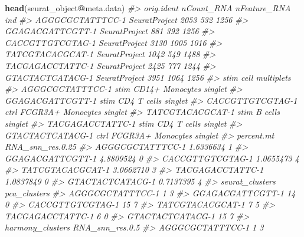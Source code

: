 \documentclass[
]{book}
\newenvironment{Shaded}{\begin{snugshade}}{\end{snugshade}}
\newcommand{\CommentTok}[1]{\textcolor[rgb]{0.56,0.35,0.01}{\textit{#1}}}
\newcommand{\FunctionTok}[1]{\textcolor[rgb]{0.13,0.29,0.53}{\textbf{#1}}}
\newcommand{\NormalTok}[1]{#1}
\newcommand{\SpecialCharTok}[1]{\textcolor[rgb]{0.81,0.36,0.00}{\textbf{#1}}}
\begin{document}
\begin{Shaded}
\begin{Highlighting}[]
\FunctionTok{head}\NormalTok{(seurat\_object}\SpecialCharTok{@}\NormalTok{meta.data)}
\CommentTok{\#\textgreater{}                     orig.ident nCount\_RNA nFeature\_RNA  ind}
\CommentTok{\#\textgreater{} AGGGCGCTATTTCC{-}1 SeuratProject       2053          532 1256}
\CommentTok{\#\textgreater{} GGAGACGATTCGTT{-}1 SeuratProject        881          392 1256}
\CommentTok{\#\textgreater{} CACCGTTGTCGTAG{-}1 SeuratProject       3130         1005 1016}
\CommentTok{\#\textgreater{} TATCGTACACGCAT{-}1 SeuratProject       1042          549 1488}
\CommentTok{\#\textgreater{} TACGAGACCTATTC{-}1 SeuratProject       2425          777 1244}
\CommentTok{\#\textgreater{} GTACTACTCATACG{-}1 SeuratProject       3951         1064 1256}
\CommentTok{\#\textgreater{}                  stim              cell multiplets}
\CommentTok{\#\textgreater{} AGGGCGCTATTTCC{-}1 stim   CD14+ Monocytes    singlet}
\CommentTok{\#\textgreater{} GGAGACGATTCGTT{-}1 stim       CD4 T cells    singlet}
\CommentTok{\#\textgreater{} CACCGTTGTCGTAG{-}1 ctrl FCGR3A+ Monocytes    singlet}
\CommentTok{\#\textgreater{} TATCGTACACGCAT{-}1 stim           B cells    singlet}
\CommentTok{\#\textgreater{} TACGAGACCTATTC{-}1 stim       CD4 T cells    singlet}
\CommentTok{\#\textgreater{} GTACTACTCATACG{-}1 ctrl FCGR3A+ Monocytes    singlet}
\CommentTok{\#\textgreater{}                  percent.mt RNA\_snn\_res.0.25}
\CommentTok{\#\textgreater{} AGGGCGCTATTTCC{-}1  1.6336634                1}
\CommentTok{\#\textgreater{} GGAGACGATTCGTT{-}1  4.8809524                0}
\CommentTok{\#\textgreater{} CACCGTTGTCGTAG{-}1  1.0655473                4}
\CommentTok{\#\textgreater{} TATCGTACACGCAT{-}1  3.0662710                3}
\CommentTok{\#\textgreater{} TACGAGACCTATTC{-}1  1.0837849                0}
\CommentTok{\#\textgreater{} GTACTACTCATACG{-}1  0.7137395                4}
\CommentTok{\#\textgreater{}                  seurat\_clusters pca\_clusters}
\CommentTok{\#\textgreater{} AGGGCGCTATTTCC{-}1               1            3}
\CommentTok{\#\textgreater{} GGAGACGATTCGTT{-}1              14            0}
\CommentTok{\#\textgreater{} CACCGTTGTCGTAG{-}1              15            7}
\CommentTok{\#\textgreater{} TATCGTACACGCAT{-}1               7            5}
\CommentTok{\#\textgreater{} TACGAGACCTATTC{-}1               6            0}
\CommentTok{\#\textgreater{} GTACTACTCATACG{-}1              15            7}
\CommentTok{\#\textgreater{}                  harmony\_clusters RNA\_snn\_res.0.5}
\CommentTok{\#\textgreater{} AGGGCGCTATTTCC{-}1                1               3}

\end{Highlighting}
\end{Shaded}
\end{document}
